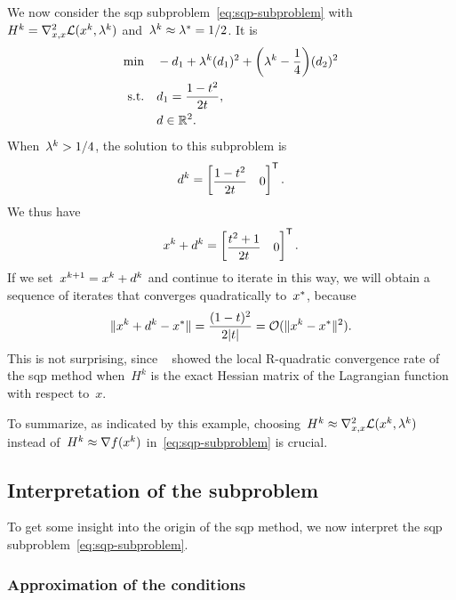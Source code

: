 We now consider the \gls{sqp} subproblem~\cref{eq:sqp-subproblem} with~$H^k = \nabla_{x, x}^2 \lag(\iter[k], \lm[k])$ and~$\lm[k] \approx \lm[\ast] = 1/2$.
It is
\begin{align*}
    \min        & \quad -\step_1 + \lm[k] (\step_1)^2 + \bigg( \lm[k] - \frac{1}{4} \bigg) (\step_2)^2\\
    \text{s.t.} & \quad \step_1 = \frac{1 - t^2}{2 t},\\
                & \quad \step \in \R^2. \nonumber
\end{align*}
When~$\lm[k] > 1/4$, the solution to this subproblem is
\begin{equation*}
    \step[k] =
    \begin{bmatrix}
        \dfrac{1 - t^2}{2 t}    & 0
    \end{bmatrix}^{\T}.
\end{equation*}
We thus have
\begin{equation*}
    \iter[k] + \step[k] = 
    \begin{bmatrix}
        \dfrac{t^2 + 1}{2 t}  & 0
    \end{bmatrix}^{\T}.
\end{equation*}
If we set~$\iter[k + 1] = \iter[k] + \step[k]$ and continue to iterate in this way, we will obtain a sequence of iterates that converges quadratically to~$\iter[\ast]$, because
\begin{equation*}
    \norm{\iter[k] + \step[k] - \iter[\ast]} = \frac{(1 - t)^2}{2 \abs{t}} = \bigo(\norm{\iter[k] - \iter[\ast]}^2).
\end{equation*}
This is not surprising, since \citeauthor{Robinson_1974}~\cite{Robinson_1974} showed the local R-quadratic convergence rate of the \gls{sqp} method when~$H^k$ is the exact Hessian matrix of the Lagrangian function with respect to~$x$.

To summarize, as indicated by this example, choosing~$H^k \approx \nabla_{x, x}^2 \lag(\iter[k], \lm[k])$ instead of~$H^k \approx \nabla \obj(\iter[k])$ in~\cref{eq:sqp-subproblem} is crucial.

\subsection{Interpretation of the subproblem}

To get some insight into the origin of the \gls{sqp} method, we now interpret the \gls{sqp} subproblem~\cref{eq:sqp-subproblem}.

\subsubsection{Approximation of the  conditions}

